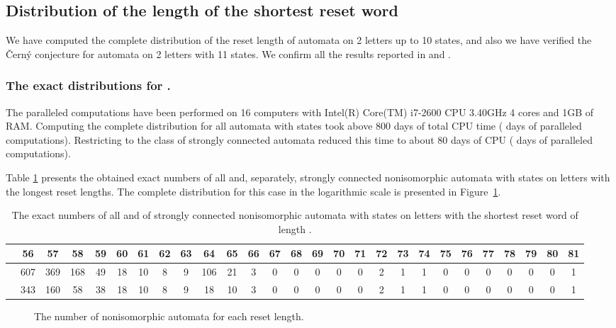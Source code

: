 \documentclass[runningheads,a4paper]{llncs}
\newcommand{\<}{\langle}
\renewcommand{\>}{\rangle}
\begin{document}
\subsection{Distribution of the length of the shortest reset word}
We have computed the complete distribution of the reset length of automata on 2 letters up to 10 states, and also we have verified the \v{C}ern\'{y} conjecture for automata on 2 letters with 11 states. We confirm all the results reported in \cite{Tr2006} and \cite{AGV2010}.

\subsubsection{The exact distributions for .}

The paralleled computations have been performed on 16 computers with Intel(R) Core(TM) i7-2600 CPU 3.40GHz 4 cores and 1GB of RAM. Computing the complete distribution for all automata with  states took above 800 days of total CPU time ( days of paralleled computations). Restricting to the class of strongly connected automata reduced this time to about 80 days of CPU ( days of paralleled computations).

Table \ref{tab:dist10} presents the obtained exact numbers of all and, separately, strongly connected nonisomorphic automata with  states on  letters with the longest reset lengths. The complete distribution for this case in the logarithmic scale is presented in Figure~\ref{fig:dist10}.

\begin{table}\label{tab:dist10}
\centering
\caption{The exact numbers  of all and  of strongly connected nonisomorphic automata with  states on  letters with the shortest reset word of length .}
\begin{tabular}{|p{1cm}||c|c|c|c|c|c|c|c|c|c|c|c|c|c|c|c|c|c|c|c|c|c|c|c|c|c|}\hline
                 & 56& 57& 58&59&60&61&62&63& 64&65&66&67&68&69&70&71&72&73&74&75&76&77&78&79&80&81 \\ \hline
              &607&369&168&49&18&10& 8& 9&106&21& 3& 0& 0& 0& 0& 0& 2& 1& 1& 0& 0& 0& 0& 0& 0& 1 \\ \hline
&343&160& 58&38&18&10& 8& 9&18 &10& 3& 0& 0& 0& 0& 0& 2& 1& 1& 0& 0& 0& 0& 0& 0& 1 \\ \hline
\end{tabular}
\end{table}

\begin{figure}\label{fig:dist10}
 \centering
 \caption[]{The number of nonisomorphic automata for each reset length.}
\end{figure}
\end{document}
